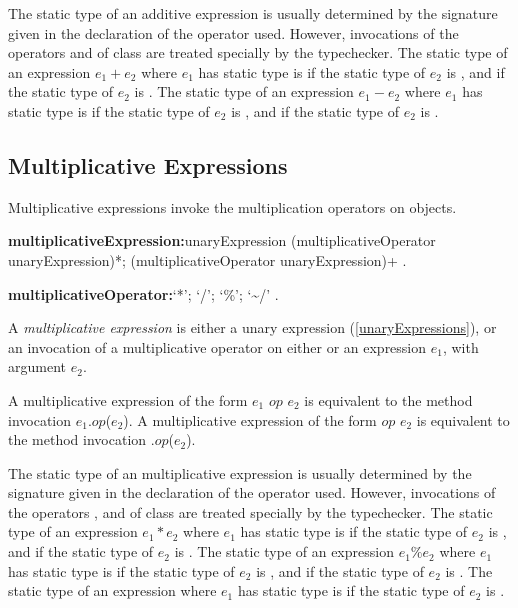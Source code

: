 \documentclass{article}
\newcommand{\code}[1]{{\sf #1}}
\begin{document}
\LMHash{}
The static type of an additive expression is usually determined by the signature given in the declaration of the operator used. However, invocations of the operators \cd{+}  and \cd{-} of class  are treated specially by the typechecker. The static type of an expression $e_1 + e_2$ where $e_1$ has static type  is  if the static type of $e_2$ is , and  if the static type of $e_2$ is . The static type of an expression $e_1 - e_2$ where $e_1$ has static type  is  if the static type of $e_2$ is , and  if the static type of $e_2$ is .
 
 
\subsection{ Multiplicative Expressions}

\LMHash{}
Multiplicative expressions invoke the multiplication operators on objects.

 \begin{grammar}
{\bf multiplicativeExpression:}unaryExpression (multiplicativeOperator unaryExpression)*;
      \SUPER{} (multiplicativeOperator unaryExpression)+
    .

{\bf multiplicativeOperator:}`*';
      `/';
      `\%';
      `\~{}/'
    .
    
 \end{grammar}
    
\LMHash{}
 A {\em multiplicative expression} is either a unary expression (\ref{unaryExpressions}), or an invocation of a multiplicative operator on either \SUPER{} or an expression $e_1$, with argument $e_2$.
 
\LMHash{}
 A multiplicative expression of the form  $e_1$ $op$ $e_2$ is equivalent to the method invocation \code{$e_1$.$op$($e_2$)}. A multiplicative expression of the form  \SUPER{} $op$ $e_2$ is equivalent to the method invocation \code{\SUPER{}.$op$($e_2$)}.   
 
\LMHash{}
The static type of an multiplicative expression is usually determined by the signature given in the declaration of the operator used. However, invocations of the operators \cd{*}, \cd{\%}  and \cd{\~{}/} of class  are treated specially by the typechecker. The static type of an expression $e_1 * e_2$ where $e_1$ has static type  is  if the static type of $e_2$ is , and  if the static type of $e_2$ is . The static type of an expression $e_1 \% e_2$ where $e_1$ has static type  is  if the static type of $e_2$ is , and  if the static type of $e_2$ is .  The static type of an expression  where $e_1$ has static type  is  if the static type of $e_2$ is .
 
\end{document}
